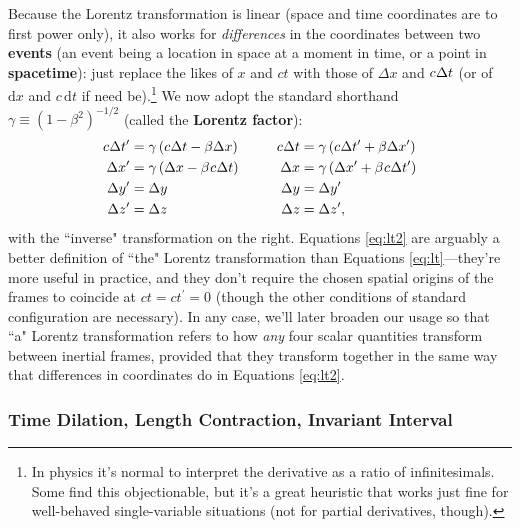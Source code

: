 \documentclass[12pt]{article}
\newcommand{\dd}[1]{\mathrm{d}#1}
\begin{document}
Because the Lorentz transformation is linear (space and time coordinates are to first power only), it also works for \emph{differences} in the coordinates between two \textbf{events} (an event being a location in space at a moment in time, or a point in \textbf{spacetime}): just replace the likes of $x$ and $ct$ with those of $\Delta x$ and $c \mkern.5mu \Delta t$ (or of $\dd x$ and $c \, \dd t$ if need be).\footnote{\label{fn:in}In physics it's normal to interpret the derivative as a ratio of infinitesimals. Some find this objectionable, but it's a great heuristic that works just fine for well-behaved single-variable situations (not for partial derivatives, though).} We now adopt the standard shorthand $\gamma \equiv (1 - \beta^2)^{-1/2}$ (called the \textbf{Lorentz factor}):
\begin{equation}\label{eq:lt2}
\begin{aligned}
c \mkern.5mu \Delta t^{\prime} &= \gamma \left( c \mkern.5mu \Delta t - \beta \Delta x \right) & c \mkern.5mu \Delta t &= \gamma \left( c \mkern.5mu \Delta t^\prime + \beta \Delta x^\prime \right) \\
\Delta x^{\prime} &= \gamma \left( \Delta x - \beta \mkern1mu c \mkern.5mu \Delta t \right) & \qquad \Delta x &= \gamma \left( \Delta x^\prime + \beta \mkern1mu c \mkern.5mu \Delta t^\prime \right) \\
\Delta y^{\prime} &= \Delta y& \Delta y&= \Delta y^\prime \\
\Delta z^{\prime} &= \Delta z& \Delta z&= \Delta z^\prime ,
\end{aligned}
\end{equation}
with the ``inverse" transformation on the right. Equations \ref{eq:lt2} are arguably a better definition of ``the" Lorentz transformation than Equations \ref{eq:lt}---they're more useful in practice, and they don't require the chosen spatial origins of the frames to coincide at $ct = ct^\prime = 0$ (though the other conditions of standard configuration are necessary). In any case, we'll later broaden our usage so that ``a" Lorentz transformation refers to how \emph{any} four scalar quantities transform between inertial frames, provided that they transform together in the same way that differences in coordinates do in Equations \ref{eq:lt2}.



\subsubsection{Time Dilation, Length Contraction, Invariant Interval}\label{sssec:td}
\end{document}
